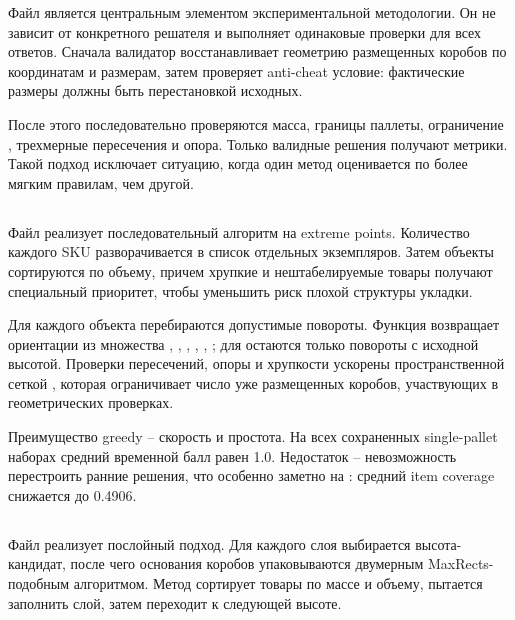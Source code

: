 Файл  является центральным элементом экспериментальной методологии. Он не зависит от конкретного решателя и выполняет одинаковые проверки для всех ответов. Сначала валидатор восстанавливает геометрию размещенных коробов по координатам и размерам, затем проверяет anti-cheat условие: фактические размеры должны быть перестановкой исходных.

После этого последовательно проверяются масса, границы паллеты, ограничение , трехмерные пересечения и опора. Только валидные решения получают метрики. Такой подход исключает ситуацию, когда один метод оценивается по более мягким правилам, чем другой.

\subsection{}

Файл  реализует последовательный алгоритм на extreme points. Количество каждого SKU разворачивается в список отдельных экземпляров. Затем объекты сортируются по объему, причем хрупкие и нештабелируемые товары получают специальный приоритет, чтобы уменьшить риск плохой структуры укладки.

Для каждого объекта перебираются допустимые повороты. Функция  возвращает ориентации из множества , , , , , ; для  остаются только повороты с исходной высотой. Проверки пересечений, опоры и хрупкости ускорены пространственной сеткой , которая ограничивает число уже размещенных коробов, участвующих в геометрических проверках.

Преимущество greedy -- скорость и простота. На всех сохраненных single-pallet наборах средний временной балл равен 1.0. Недостаток -- невозможность перестроить ранние решения, что особенно заметно на : средний item coverage снижается до 0.4906.

\subsection{}

Файл  реализует послойный подход. Для каждого слоя выбирается высота-кандидат, после чего основания коробов упаковываются двумерным MaxRects-подобным алгоритмом. Метод сортирует товары по массе и объему, пытается заполнить слой, затем переходит к следующей высоте.

